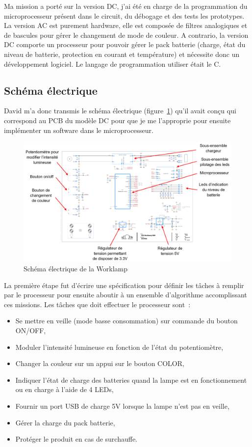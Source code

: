 \documentclass[a4paper, 12pt, sffamily]{report}
\begin{document}
Ma mission a porté sur la version DC, j’ai été en charge de la programmation du microprocesseur présent dans le circuit, du débogage et des tests les prototypes. La version AC est purement hardware, elle est composée de filtres analogiques et de bascules pour gérer le changement de mode de couleur. A contrario, la version DC comporte un processeur pour pouvoir gérer le pack batterie (charge, état du niveau de batterie, protection en courant et température) et nécessite donc un développement logiciel. Le langage de programmation utiliser était le C.

\subsection{Schéma électrique}
David m’a donc transmis le schéma électrique (figure~\ref{fig:worklamp_schema}) qu’il avait conçu qui correspond au PCB du modèle DC pour que je me l’approprie pour ensuite implémenter un software dans le microprocesseur.

\begin{figure}[h]
\centering
\includegraphics[scale=0.51]{figures/screenshots/version_A3_worklamp.png}
\caption{Schéma électrique de la Worklamp}
\label{fig:worklamp_schema}
\end{figure}

La première étape fut d’écrire une spécification pour définir les tâches à remplir par le processeur pour ensuite aboutir à un ensemble d’algorithme accomplissant ces missions.
Les tâches que doit effectuer le processeur sont~:
\begin{itemize} %
\item Se mettre en veille (mode basse consommation) sur commande du bouton ON/OFF,
\item Moduler l’intensité lumineuse en fonction de l’état du potentiomètre,
\item Changer la couleur sur un appui sur le bouton COLOR,
\item Indiquer l’état de charge des batteries quand la lampe est en fonctionnement ou en charge à l’aide de 4 LEDs,
\item Fournir un port USB de charge 5V lorsque la lampe n’est pas en veille,
\item Gérer la charge du pack batterie,
\item Protéger le produit en cas de surchauffe.
\end{itemize}
\end{document}

